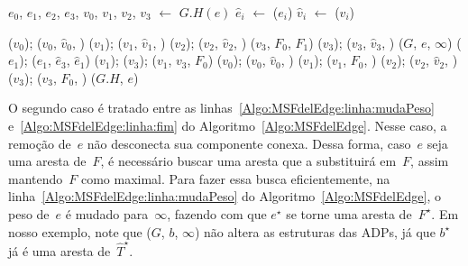 \begin{algorithm}[hbt]
\caption{\MSFdelEdge($G$, $e$)}
\label{Algo:MSFdelEdge}
\begin{algorithmic}[1]
\State $e_0$, $e_1$, $e_2$, $e_3$, $v_0$, $v_1$, $v_2$, $v_3$ $\gets$ $G.H(e)$ \label{Algo:MSFdelEdge:linha:1}
\label{Algo:MSFdelEdge:linha:laco}
\State $\hat e_i$ $\gets$ \LCOFindNode($e_i$)
\State $\hat v_i$ $\gets$ \LCOFindNode($v_i$)
\EndFor

\label{Algo:MSFdelEdge:linha2}

\State \LCOCycle($v_0$); \LCOSplit($v_0$, $\hat v_0$, \Nil)\label{Algo:MSFdelEdge:linha3}
\State \LCOCycle($v_1$); \LCOSplit($v_1$, $\hat v_1$, \Nil)\label{Algo:MSFdelEdge:c1:v1}
\State \LCOCycle($v_2$); \LCOSplit($v_2$, $\hat v_2$, \Nil)\label{Algo:MSFdelEdge:c1:v2}
\State \LCOSplit($v_3$, $F_0$, $F_1$) \label{Algo:MSFdelEdge:c1:split}
\State \LCOCycle($v_3$); \LCOSplit($v_3$, $\hat v_3$, \Nil)\label{Algo:MSFdelEdge:linha12}
\Else{}
\State \MSFupdate($G$, $e$, $\infty$)\label{Algo:MSFdelEdge:linha:mudaPeso}
\State \LCOCycle($e_1$); \LCOSplit($e_1$, $\hat e_3$, $\hat e_1$) \label{Algo:MSFdelEdge:linha:split}
\State \LCOCycle($v_1$); \LCOCycle($v_3$); \LCOMerge($v_1$, $v_3$, $F_0$) \label{Algo:MSFdelEdge:linha:merge}
\State \LCOCycle($v_0$); \LCOSplit($v_0$, $\hat v_0$, \Nil) \label{Algo:MSFdelEdge:linha:1cs}
\State \LCOCycle($v_1$); \LCOSplit($v_1$, $F_0$, \Nil )
\State \LCOCycle($v_2$); \LCOSplit($v_2$, $\hat v_2$, \Nil)
\State \LCOCycle($v_3$); \LCOSplit($v_3$, $F_0$, \Nil)
	\label{Algo:MSFdelEdge:linha:ucs}
	\label{Algo:MSFdelEdge:linha:fim}
\EndIf
\State \LCODestroyOcto($G.H$, $e$)\label{Algo:MSFdelEdge:linha:desaloca}
\end{algorithmic}
\end{algorithm}

O segundo caso é tratado entre as linhas~\ref{Algo:MSFdelEdge:linha:mudaPeso} e~\ref{Algo:MSFdelEdge:linha:fim} do Algoritmo~\ref{Algo:MSFdelEdge}.
Nesse caso, a remoção de~$e$ não desconecta sua componente conexa.
Dessa forma, caso~$e$ seja uma aresta de~$F$, é necessário buscar uma aresta que a substituirá em~$F$, assim mantendo~$F$ como maximal.
Para fazer essa busca eficientemente, na linha~\ref{Algo:MSFdelEdge:linha:mudaPeso} do Algoritmo~\ref{Algo:MSFdelEdge}, o peso de~$e$ é mudado para~$\infty$, fazendo com que $e^\star$ se torne uma aresta de~$F^\star$. 
Em nosso exemplo, note que \MSFupdate($G$, $b$, $\infty$) não altera as estruturas das ADPs, já que $b^\star$ já é uma aresta de~$\hat T^\star$.

